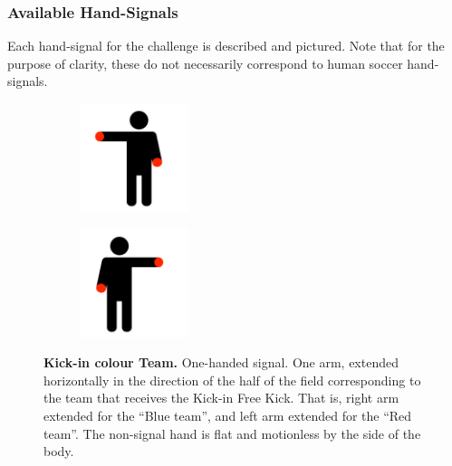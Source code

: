     \subsubsection{Available Hand-Signals}

        Each hand-signal for the challenge is described and pictured. Note that for the purpose of clarity, these do not necessarily correspond to human soccer hand-signals.

        \begin{figure}[ht!]
            \centering
            \begin{subfigure}{.33\textwidth}
              \includegraphics[height=120px]{figs/referee-signals/kick-in.png}
            \end{subfigure}
            \begin{subfigure}{.33\textwidth}
              \includegraphics[height=120px]{figs/referee-signals/kick-in-flipped.png}
            \end{subfigure}
            \caption{\textbf{Kick-in \textlangle{}colour\textrangle{} Team.} One-handed signal. One arm, extended horizontally in the direction of the half of the field corresponding to the team that receives the Kick-in Free Kick. That is, right arm extended for the ``Blue team'', and left arm extended for the ``Red team''. The non-signal hand is flat and motionless by the side of the body.}
        \end{figure}
            
